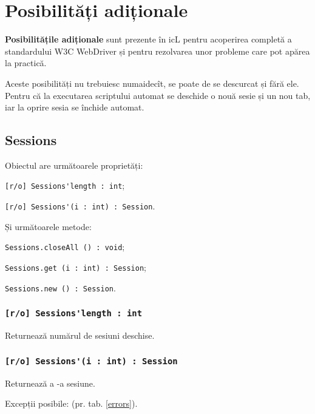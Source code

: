 

\section{Posibilități adiționale}

{\bf Posibilitățile adiționale} sunt prezente în icL pentru acoperirea completă a standardului W3C WebDriver și pentru rezolvarea unor probleme care pot apărea la practică.

Aceste posibilități nu trebuiesc numaidecît, se poate de se descurcat și fără ele. Pentru că la executarea scriptului automat se deschide o nouă sesie și un nou tab, iar la oprire sesia se închide automat.

\subsection{{\color{orange} Sessions}}

Obiectul \sessions{} are următoarele proprietăți:
\begin{icItems}
	\item \lstinline|[r/o] Sessions'length : int|;
	\item \lstinline|[r/o] Sessions'(i : int) : Session|.
\end{icItems}

Și următoarele metode:
\begin{icItems}
	\item \lstinline|Sessions.closeAll () : void|;
	\item \lstinline|Sessions.get (i : int) : Session|;
	\item \lstinline|Sessions.new () : Session|.
\end{icItems}

\subsubsection{\lstinline|[r/o] Sessions'length : int|}

Returnează numărul de sesiuni deschise.

\subsubsection{\lstinline|[r/o] Sessions'(i : int) : Session|}

Returnează a -a sesiune.

Excepții posibile:  (pr. tab. \ref{errors}).

